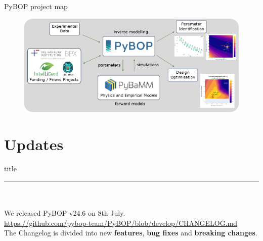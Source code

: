 \documentclass[aspectratio=169]{beamer}
\begin{document}
\begin{frame}{PyBOP project map}
    \vspace{-6mm}
    \begin{figure}
        \centering
        \includegraphics[height=0.42\textwidth]{Images/Diagrams/PyBOP-high-level.png}
        \label{fig:project_map}
    \end{figure}
\end{frame}

\section{Updates}

\begin{frame}[plain]
    \centering
    \begin{beamercolorbox}[sep=8pt,center,shadow=true,rounded=true]{title}
    \par%
    \color{oxfordblue}\noindent\rule{10cm}{1pt} \\
    \LARGE{\faCloudUpload} \\
    \vspace{6mm} \normalsize
    We released PyBOP v24.6 on 8th July. \\
    \vspace{6mm}
    \href{https://github.com/pybop-team/PyBOP/blob/develop/CHANGELOG.md}{https://github.com/pybop-team/PyBOP/blob/develop/CHANGELOG.md} \\
    \vspace{6mm}
    The Changelog is divided into new \textbf{features},  \textbf{bug fixes} and \textbf{breaking changes}.
    \end{beamercolorbox}
\end{frame}
\end{document}
